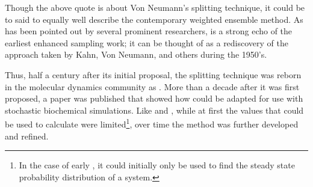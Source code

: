 Though the above quote is about Von Neumann's splitting technique, it could be to said to equally well describe the contemporary weighted ensemble  method. As has been pointed out by several prominent  researchers\supercite{Zuckerman:2017eq,Chong:2017bv},  is a strong echo of the earliest enhanced sampling work; it can be thought of as a rediscovery of the approach taken by Kahn, Von Neumann, and others during the 1950's.

Thus, half a century after its initial proposal, the splitting technique was reborn in the molecular dynamics community\supercite{Huber:1996dn} as . More than a decade after it was first proposed, a paper\supercite{Bhatt:2010df} was published that showed how  could be adapted for use with stochastic biochemical simulations. Like  and , while at first the values that  could be used to calculate were limited\footnote{In the case of early , it could initially only be used to find the steady state probability distribution of a system.}, over time the method was further developed and refined. 


